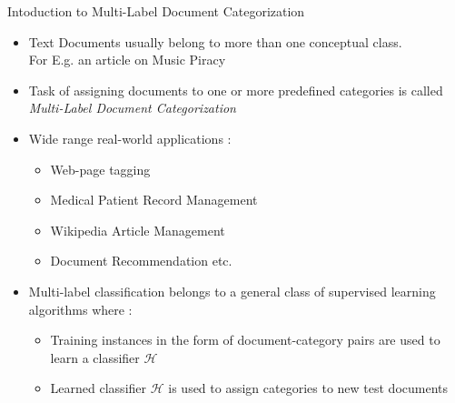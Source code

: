 \documentclass[10pt]{beamer}
\begin{document}
\begin{frame}{Intoduction to Multi-Label Document Categorization}
\begin{itemize}
	\vfill\item<1-> Text Documents usually belong to more than one conceptual class. \\For E.g. an article on Music Piracy 
	\vfill\item<2-> Task of assigning documents to one or more predefined categories is called \emph{Multi-Label Document Categorization}
	\vfill\item<3-> Wide range real-world applications :
	\begin{itemize} 
	  \vfill\item<3-> Web-page tagging
	  \vfill\item<3-> Medical Patient Record Management
	  \vfill\item<3-> Wikipedia Article Management
	  \vfill\item<3-> Document Recommendation etc.
	\end{itemize} 
	\vfill\item<4-> Multi-label classification belongs to a general class of supervised learning algorithms where : 
	\begin{itemize}
	  \vfill\item<5-> Training instances in the form of document-category pairs are used to learn a classifier $\mathcal{H}$ 
	  \vfill\item<6-> Learned classifier $\mathcal{H}$ is used to assign categories to new test documents
	\end{itemize}
\end{itemize}
\vfill
\end{frame}

\end{document}

